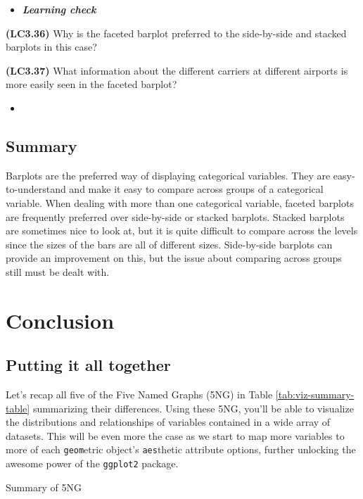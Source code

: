 \documentclass[12pt,]{krantz}
\newenvironment{rmdblock}[1]
  {\begin{shaded*}
  \begin{itemize}
  \renewcommand{\labelitemi}{
    \raisebox{-.7\height}[0pt][0pt]{
    }
  }
  \item
  }
  {
  \end{itemize}
  \end{shaded*}
  }
\newenvironment{learncheck}
  {\begin{rmdblock}{warning}}
  {\end{rmdblock}}
\begin{document}
\begin{learncheck}
\textbf{\emph{Learning check}}
\end{learncheck}

\textbf{(LC3.36)} Why is the faceted barplot preferred to the
side-by-side and stacked barplots in this case?

\textbf{(LC3.37)} What information about the different carriers at
different airports is more easily seen in the faceted barplot?

\begin{learncheck}

\end{learncheck}

\subsection{Summary}\label{summary-4}

Barplots are the preferred way of displaying categorical variables. They
are easy-to-understand and make it easy to compare across groups of a
categorical variable. When dealing with more than one categorical
variable, faceted barplots are frequently preferred over side-by-side or
stacked barplots. Stacked barplots are sometimes nice to look at, but it
is quite difficult to compare across the levels since the sizes of the
bars are all of different sizes. Side-by-side barplots can provide an
improvement on this, but the issue about comparing across groups still
must be dealt with.

\section{Conclusion}\label{conclusion-1}

\subsection{Putting it all together}\label{putting-it-all-together}

Let's recap all five of the Five Named Graphs (5NG) in Table
\ref{tab:viz-summary-table} summarizing their differences. Using these
5NG, you'll be able to visualize the distributions and relationships of
variables contained in a wide array of datasets. This will be even more
the case as we start to map more variables to more of each
\texttt{geom}etric object's \texttt{aes}thetic attribute options,
further unlocking the awesome power of the \texttt{ggplot2} package.

\label{tab:viz-summary-table}Summary of 5NG
\end{document}
